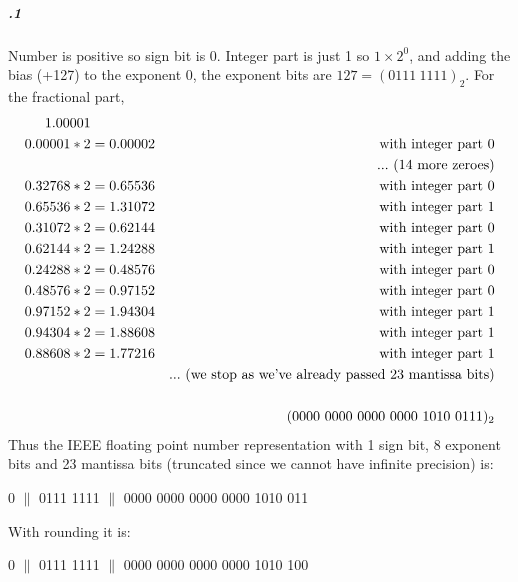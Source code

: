 \documentclass[11pt,letterpaper]{article}
\begin{document}
		\subparagraph{.1}
		Number is positive so sign bit is 0.
		Integer part is just 1 so $1 \times 2^0$, and adding the bias (+127) to the exponent 0, the exponent bits are $127 = (0111\ 1111)_{2}$.
		For the fractional part,
		\begin{align*}
		1.00001\\
		0.00001 * 2 &= 0.00002&\textnormal{with integer part 0}\\
		&&...\textnormal{ (14 more zeroes)}\\
		0.32768 * 2 &= 0.65536&\textnormal{with integer part 0}\\
		0.65536 * 2 &= 1.31072&\textnormal{with integer part 1}\\
		0.31072 * 2 &= 0.62144&\textnormal{with integer part 0}\\
		0.62144 * 2 &= 1.24288&\textnormal{with integer part 1}\\
		0.24288 * 2 &= 0.48576&\textnormal{with integer part 0}\\
		0.48576 * 2 &= 0.97152&\textnormal{with integer part 0}\\
		0.97152 * 2 &= 1.94304&\textnormal{with integer part 1}\\
		0.94304 * 2 &= 1.88608&\textnormal{with integer part 1}\\
		0.88608 * 2 &= 1.77216&\textnormal{with integer part 1}\\
		&&...\textnormal{ (we stop as we've already passed 23 mantissa bits)}\\
		\\
		&&(0000\ 0000\ 0000\ 0000\ 1010\ 0111)_2
		\end{align*}
		Thus the IEEE floating point number representation with 1 sign bit, 8 exponent bits and 23 mantissa bits (truncated since we cannot have infinite precision) is:
		\begin{center}
		0 $\|$ 0111 1111 $\|$ 0000 0000 0000 0000 1010 011
		\end{center}
		With rounding it is:
		\begin{center}
		0 $\|$ 0111 1111 $\|$ 0000 0000 0000 0000 1010 100
		\end{center}
		
\end{document}
